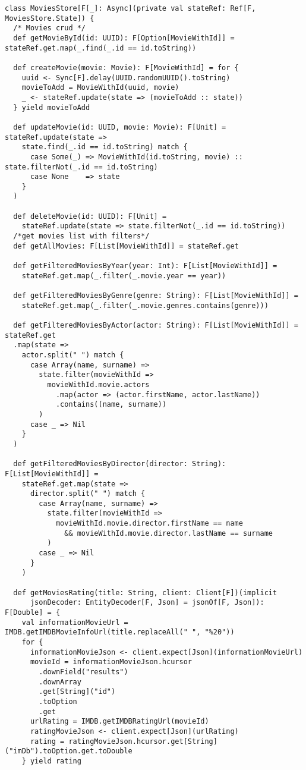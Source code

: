 \begin{verbatim}
class MoviesStore[F[_]: Async](private val stateRef: Ref[F, MoviesStore.State]) {
  /* Movies crud */
  def getMovieById(id: UUID): F[Option[MovieWithId]] = stateRef.get.map(_.find(_.id == id.toString))

  def createMovie(movie: Movie): F[MovieWithId] = for {
    uuid <- Sync[F].delay(UUID.randomUUID().toString)
    movieToAdd = MovieWithId(uuid, movie)
    _ <- stateRef.update(state => (movieToAdd :: state))
  } yield movieToAdd

  def updateMovie(id: UUID, movie: Movie): F[Unit] = stateRef.update(state =>
    state.find(_.id == id.toString) match {
      case Some(_) => MovieWithId(id.toString, movie) :: state.filterNot(_.id == id.toString)
      case None    => state
    }
  )

  def deleteMovie(id: UUID): F[Unit] =
    stateRef.update(state => state.filterNot(_.id == id.toString))
  /*get movies list with filters*/
  def getAllMovies: F[List[MovieWithId]] = stateRef.get

  def getFilteredMoviesByYear(year: Int): F[List[MovieWithId]] =
    stateRef.get.map(_.filter(_.movie.year == year))

  def getFilteredMoviesByGenre(genre: String): F[List[MovieWithId]] =
    stateRef.get.map(_.filter(_.movie.genres.contains(genre)))

  def getFilteredMoviesByActor(actor: String): F[List[MovieWithId]] = stateRef.get
  .map(state =>
    actor.split(" ") match {
      case Array(name, surname) =>
        state.filter(movieWithId =>
          movieWithId.movie.actors
            .map(actor => (actor.firstName, actor.lastName))
            .contains((name, surname))
        )
      case _ => Nil
    }
  )

  def getFilteredMoviesByDirector(director: String): F[List[MovieWithId]] =
    stateRef.get.map(state =>
      director.split(" ") match {
        case Array(name, surname) =>
          state.filter(movieWithId =>
            movieWithId.movie.director.firstName == name
              && movieWithId.movie.director.lastName == surname
          )
        case _ => Nil
      }
    )

  def getMoviesRating(title: String, client: Client[F])(implicit
      jsonDecoder: EntityDecoder[F, Json] = jsonOf[F, Json]): F[Double] = {
    val informationMovieUrl = IMDB.getIMDBMovieInfoUrl(title.replaceAll(" ", "%20"))
    for {
      informationMovieJson <- client.expect[Json](informationMovieUrl)
      movieId = informationMovieJson.hcursor
        .downField("results")
        .downArray
        .get[String]("id")
        .toOption
        .get
      urlRating = IMDB.getIMDBRatingUrl(movieId)
      ratingMovieJson <- client.expect[Json](urlRating)
      rating = ratingMovieJson.hcursor.get[String]("imDb").toOption.get.toDouble
    } yield rating


\end{verbatim}
